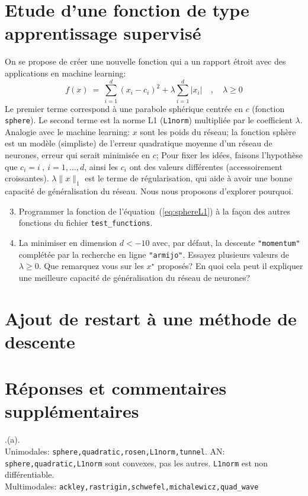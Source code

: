 \documentclass[12pt]{article}
\begin{document}
\section*{Etude d'une fonction de type apprentissage supervisé}
On se propose de créer une nouvelle fonction qui a un rapport étroit avec des applications en machine learning:
\begin{equation}
f(x) ~=~ \sum_{i=1}^d (x_i-c_i)^2 + \lambda \sum_{i=1}^d \lvert x_i \rvert \quad,\quad \lambda \ge 0
\label{eq:sphereL1}
\end{equation}
Le premier terme correspond à une parabole sphérique centrée en $c$ (fonction \texttt{sphere}). 
Le second terme est la norme L1 (\texttt{L1norm}) multipliée par le coefficient $\lambda$.\\
Analogie avec le machine learning: $x$ sont les poids du réseau; 
la fonction sphère est un modèle (simpliste) de l'erreur quadratique moyenne d'un réseau de neurones, erreur qui serait minimisée en $c$; 
Pour fixer les idées, faisons l'hypothèse que $c_i = i~,~i=1,\ldots,d$, ainsi les $c_i$ ont des valeurs différentes (accessoirement croissantes).
$\lambda \lVert x \rVert_1$ est le terme de régularisation, qui aide à avoir une bonne capacité de généralisation du réseau. 
Nous nous proposons d'explorer pourquoi.
\begin{enumerate}
\setcounter{enumi}{2}
\item Programmer la fonction de l'équation~(\ref{eq:sphereL1}) à la façon des autres fonctions du fichier \texttt{test_functions}.
\item La minimiser en dimension $d<-10$ avec, par défaut, la descente \texttt{"momentum"} complétée par la recherche en ligne \texttt{"armijo"}. 
Essayez plusieurs valeurs de $\lambda \ge 0$.
Que remarquez vous sur les $x^\star$ proposés? En quoi cela peut il expliquer une meilleure capacité de généralisation du réseau de neurones?
\end{enumerate}


\section*{Ajout de restart à une méthode de descente}

\appendix

\section*{Réponses et commentaires supplémentaires}

.(a).\\ 
Unimodales: \texttt{sphere,quadratic,rosen,L1norm,tunnel}. AN: \texttt{sphere,quadratic,L1norm} sont convexes, pas les autres. \texttt{L1norm} est non différentiable.\\
Multimodales: \texttt{ackley,rastrigin,schwefel,michalewicz,quad\_wave}
\end{document}
